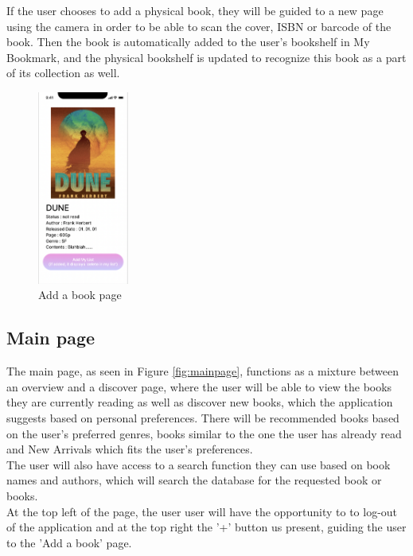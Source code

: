 \documentclass[conference]{IEEEtran}
\begin{document}
If the user chooses to add a physical book, they will be guided to a new page using the camera in order to be able to scan the cover, ISBN or barcode of the book. Then the book is automatically added to the user's bookshelf in My Bookmark, and the physical bookshelf is updated to recognize this book as a part of its collection as well.

\begin{figure}[h]
    \centering
    \includegraphics[width=3cm]{Ressources/Specifications/addabook.png}
    \caption{Add a book page}
    \label{fig:addabook}
\end{figure}

\subsection{Main page}
The main page, as seen in Figure \ref{fig:mainpage}, functions as a mixture between an overview and a discover page, where the user will be able to view the books they are currently reading as well as discover new books, which the application suggests based on personal preferences. There will be recommended books based on the user's preferred genres, books similar to the one the user has already read and New Arrivals which fits the user's preferences. \\

The user will also have access to a search function they can use based on book names and authors, which will search the database for the requested book or books.\\
At the top left of the page, the user user will have the opportunity to to log-out of the application and at the top right the '+' button us present, guiding the user to the 'Add a book' page.
\end{document}
